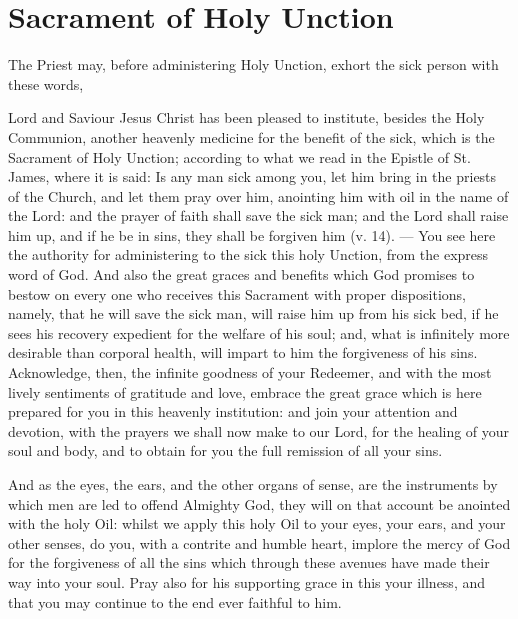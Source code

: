 \fancyhead[RE,LO]{\textit{}}
\section{Sacrament of Holy Unction}
\begin{rubric}
    The Priest may, before administering Holy Unction, exhort the sick person with these words,
\end{rubric}
 Lord and Saviour Jesus Christ has been pleased to institute, besides the Holy Communion, another heavenly medicine for the benefit of the sick, which is the Sacrament of %
Holy Unction; according to what we read in the Epistle of St. James, where it is said: Is any man sick among you, let him bring in the priests of the Church, and let them pray over him, anointing him with oil in the name of the Lord: and the prayer of faith shall save the sick man; and the Lord shall raise him up, and if he be in sins, they shall be forgiven him (v. 14). --- You see here the authority for administering to the sick this holy Unction, from the express word of God. And also the great graces and benefits which God promises to bestow on every one who receives this Sacrament with proper dispositions, namely, that he will save the sick man, will raise him up from his sick bed, if he sees his recovery expedient for the welfare of his soul; and, what is infinitely more desirable than corporal health, will impart to him the forgiveness of his sins. Acknowledge, then, the infinite goodness of your Redeemer, and with the most lively sentiments of gratitude and love, embrace the great grace which is here prepared for you in this heavenly institution: and join your attention and devotion, with the prayers we shall now make to our Lord, for the healing of your soul and body, and to obtain for you the full remission of all your sins.\par
And as the eyes, the ears, and the other organs of sense, are the instruments by which men are led to offend Almighty God, they will on that account be anointed with the holy Oil: whilst we apply this holy Oil to your eyes, your ears, and your other senses, do you, with a contrite and humble heart, implore the mercy of God for the forgiveness of all the sins which through these avenues have made their way into your soul. Pray also for his supporting grace in this your illness, and that you may continue to the end ever faithful to him.
